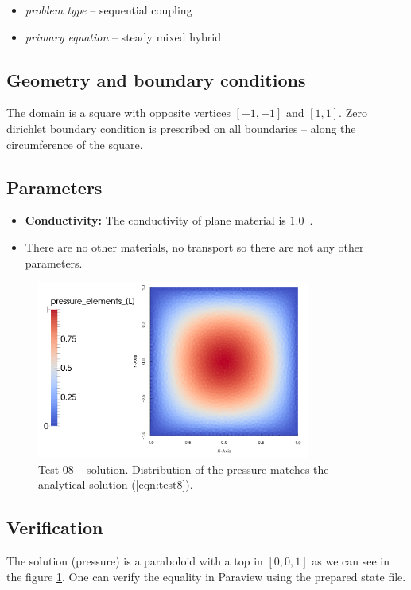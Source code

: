   \begin{itemize} 
    \item \emph{problem type} -- sequential coupling 
    \item \emph{primary equation} -- steady mixed hybrid
  \end{itemize}

\subsection*{Geometry and boundary conditions}
The domain is a square with opposite vertices $[-1,-1]$ and $[1,1]$. Zero dirichlet boundary condition is prescribed 
on all boundaries -- along the circumference of the square.
 
\subsection*{Parameters}
\begin{itemize}
  \item \textbf{Conductivity:} The conductivity of plane material is $1.0$~.
  \item There are no other materials, no transport so there are not any other parameters.
\end{itemize}
%
\begin{figure}[h!]
\centering
\includegraphics[width=0.8\textwidth]{tests_graphics/08_solution.pdf}
\caption{Test 08 -- solution. Distribution of the pressure matches the analytical solution (\ref{eqn:test8}).}
\label{fig:test8_solution}
\end{figure}
%
\subsection*{Verification}
The solution (pressure) is a paraboloid with a top in $[0,0,1]$ as we can see in the figure \ref{fig:test8_solution}. 
One can verify the equality in Paraview using the prepared state file.


